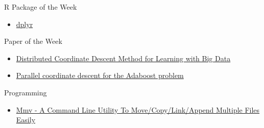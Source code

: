 \documentclass[presentation]{beamer}
\begin{document}
\begin{frame}[fragile,label=sec-2]{R Package of the Week}
\begin{itemize}
\item \href{https://github.com/hadley/dplyr}{dplyr}
\end{itemize}
\end{frame}

\begin{frame}[fragile,label=sec-3]{Paper of the Week}
\begin{itemize}
\item \href{http://arxiv.org/abs/1310.2059}{Distributed Coordinate Descent Method for Learning with Big Data}
\item \href{http://arxiv.org/abs/1310.1840}{Parallel coordinate descent for the Adaboost problem}
\end{itemize}
\end{frame}

\begin{frame}[fragile,label=sec-4]{Programming}
\begin{itemize}
\item \href{http://mylinuxbook.com/mmv-a-command-line-utility-to-move-copy-link-append-multiple-files-easily/}{Mmv - A Command Line Utility To Move/Copy/Link/Append Multiple Files Easily}
\end{itemize}
\end{frame}
\end{document}
